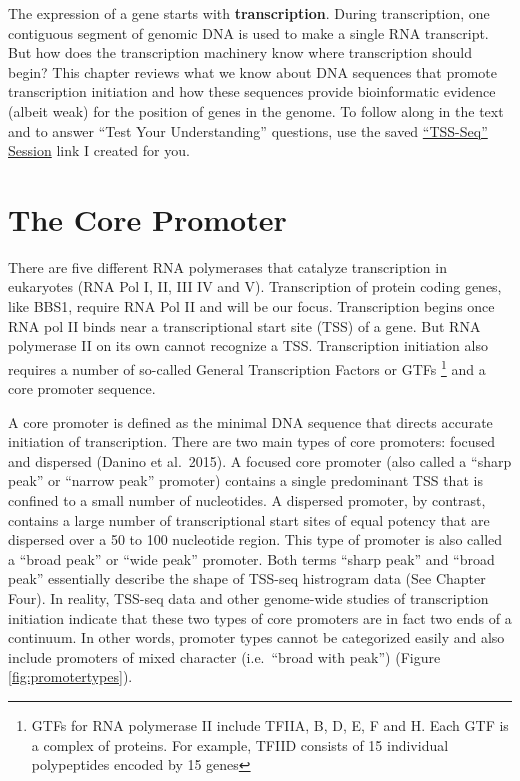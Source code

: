 \documentclass[
]{book}
\begin{document}
The expression of a gene starts with \textbf{transcription}. During transcription, one contiguous segment of genomic DNA is used to make a single RNA transcript. But how does the transcription machinery know where transcription should begin? This chapter reviews what we know about DNA sequences that promote transcription initiation and how these sequences provide bioinformatic evidence (albeit weak) for the position of genes in the genome. To follow along in the text and to answer ``Test Your Understanding'' questions, use the saved \href{https://genome.ucsc.edu/s/megallegos/Biol\%20310\%3A\%20Module\%202\%20TSS\%2Dseq}{``TSS-Seq'' Session} link I created for you.

\hypertarget{the-core-promoter}{%
\section{The Core Promoter}\label{the-core-promoter}}

There are five different RNA polymerases that catalyze transcription in eukaryotes (RNA Pol I, II, III IV and V). Transcription of protein coding genes, like BBS1, require RNA Pol II and will be our focus. Transcription begins once RNA pol II binds near a transcriptional start site (TSS) of a gene. But RNA polymerase II on its own cannot recognize a TSS. Transcription initiation also requires a number of so-called General Transcription Factors or GTFs \footnote{GTFs for RNA polymerase II include TFIIA, B, D, E, F and H. Each GTF is a complex of proteins. For example, TFIID consists of 15 individual polypeptides encoded by 15 genes} and a core promoter sequence.

A core promoter is defined as the minimal DNA sequence that directs accurate initiation of transcription. There are two main types of core promoters: focused and dispersed (Danino et al.~2015). A focused core promoter (also called a ``sharp peak'' or ``narrow peak'' promoter) contains a single predominant TSS that is confined to a small number of nucleotides. A dispersed promoter, by contrast, contains a large number of transcriptional start sites of equal potency that are dispersed over a 50 to 100 nucleotide region. This type of promoter is also called a ``broad peak'' or ``wide peak'' promoter. Both terms ``sharp peak'' and ``broad peak'' essentially describe the shape of TSS-seq histrogram data (See Chapter Four). In reality, TSS-seq data and other genome-wide studies of transcription initiation indicate that these two types of core promoters are in fact two ends of a continuum. In other words, promoter types cannot be categorized easily and also include promoters of mixed character (i.e.~``broad with peak'') (Figure \ref{fig:promotertypes}).
\end{document}
